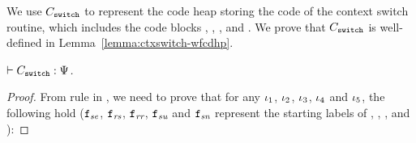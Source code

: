 We use $C_{\texttt{switch}}$ to represent the
code heap storing the code of the context switch routine,
which includes the code blocks \SwitchEntry{},
\regsave{}, \regrestore{},
\SaveUsedWin{} and \SwitchNewTask{}. We prove that
$C_{\texttt{switch}}$ is well-defined in
Lemma~\ref{lemma:ctxswitch-wfcdhp}.

\begin{lemma}
    \em
    \label{lemma:ctxswitch-wfcdhp}
    $\vdash {C_{\texttt{switch}}} : {\Psi{}}$.
\end{lemma}
\begin{proof}
    From  rule in 
    \Fig{\ref{fig:Selected Inference Rules for Refinement Verification}}, 
    we need to prove that for any $\iota_1$,
    $\iota_2$, $\iota_3$,
    $\iota_4$ and $\iota_5$, the following hold
    ($\texttt{f}_{\textit{se}}$, $\texttt{f}_{\textit{rs}}$,
    $\texttt{f}_{\textit{rr}}$, $\texttt{f}_{\textit{su}}$ and
    $\texttt{f}_{\textit{sn}}$ represent the starting labels of
    \SwitchEntry{}, \regsave{}, \regrestore{},
    \SaveUsedWin{} and \SwitchNewTask{}):
\end{proof}

